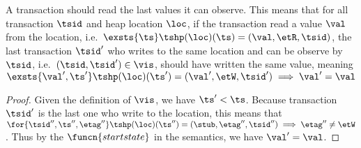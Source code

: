 \begin{lem}[External]
    \label{lem:ext}
    A transaction should read the last values it can observe.
    This means that for all transaction \( \tsid \) and heap location \( \loc \), if the transaction read a value \( \val \) from the location, i.e.\ \( \exsts{ \ts } \tshp(\loc)(\ts) = (\val, \etR, \tsid) \), the last transaction \( \tsid' \) who writes to the same location and can be observe by \( \tsid \), i.e.\ \( (\tsid, \tsid') \in \vis\), should have written the same value, meaning \( \exsts{ \val', \ts' } \tshp(\loc)(\ts') = (\val', \etW, \tsid') \implies \val' = \val\)
\end{lem}
\begin{proof}
    Given the definition of \( \vis \), we have \( \ts' < \ts \).
    Because transaction \( \tsid' \) is the last one who write to the location, this means that \( \for{ \tsid'', \ts'', \etag'' } \tshp(\loc)(\ts'') = (\stub, \etag'', \tsid'') \implies \etag'' \neq \etW \).
    Thus by the \( \funcn{startstate} \) in the semantics, we have \( \val' = \val \).
\end{proof}

